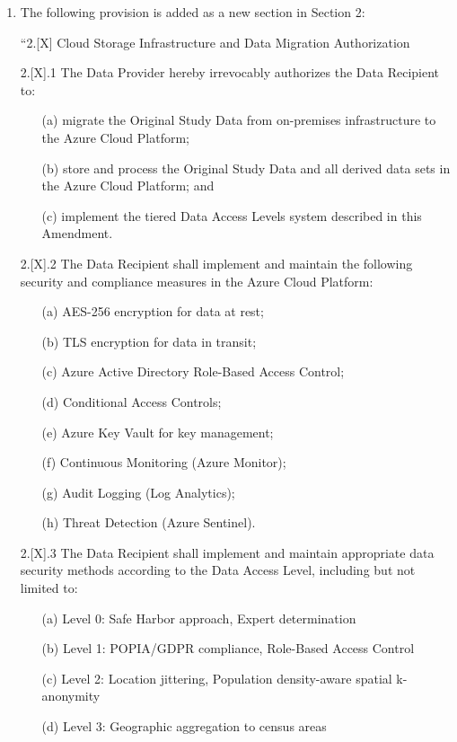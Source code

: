 \documentclass[12pt,letterpaper]{article}
\begin{document}
\begin{enumerate}
\item The following provision is added as a new section in Section 2:

``2.[X] Cloud Storage Infrastructure and Data Migration Authorization

2.[X].1 The Data Provider hereby irrevocably authorizes the Data Recipient to:
\begin{enumerate}
\item[(a)] migrate the Original Study Data from on-premises infrastructure to the Azure Cloud Platform;
\item[(b)] store and process the Original Study Data and all derived data sets in the Azure Cloud Platform; and
\item[(c)] implement the tiered Data Access Levels system described in this Amendment.
\end{enumerate}

2.[X].2 The Data Recipient shall implement and maintain the following security and compliance measures in the Azure Cloud Platform:
\begin{enumerate}
\item[(a)] AES-256 encryption for data at rest;
\item[(b)] TLS encryption for data in transit;
\item[(c)] Azure Active Directory Role-Based Access Control;
\item[(d)] Conditional Access Controls;
\item[(e)] Azure Key Vault for key management;
\item[(f)] Continuous Monitoring (Azure Monitor);
\item[(g)] Audit Logging (Log Analytics);
\item[(h)] Threat Detection (Azure Sentinel).
\end{enumerate}

2.[X].3 The Data Recipient shall implement and maintain appropriate data security methods according to the Data Access Level, including but not limited to:
\begin{enumerate}
\item[(a)] Level 0: Safe Harbor approach, Expert determination
\item[(b)] Level 1: POPIA/GDPR compliance, Role-Based Access Control
\item[(c)] Level 2: Location jittering, Population density-aware spatial k-anonymity
\item[(d)] Level 3: Geographic aggregation to census areas
\end{enumerate}


\end{enumerate}
\end{document}
